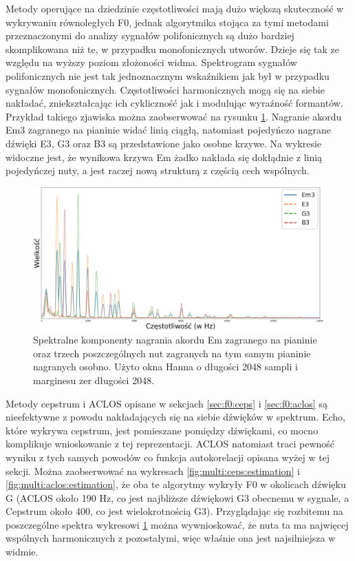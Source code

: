 \documentclass[12pt,a4paper,twoside]{mwart}
\begin{document}
Metody operujące na dziedzinie częstotliwości mają dużo większą skuteczność w wykrywaniu równoległych F0, jednak algorytmika stojąca za tymi metodami przeznaczonymi do analizy sygnałów polifonicznych są dużo bardziej skomplikowana niż te, w przypadku monofonicznych utworów. Dzieje się tak ze względu na wyższy poziom złożoności widma. Spektrogram sygnałów polifonicznych nie jest tak jednoznacznym wskaźnikiem jak był w przypadku sygnałów monofonicznych. Częstotliwości harmonicznych mogą się na siebie nakładać, zniekształcając ich cykliczność jak i modulując wyraźność formantów.  Przykład takiego zjawiska można zaobserwować na rysunku \ref{fig:multi:spectra:partials}. Nagranie akordu Em3 zagranego na pianinie widać linią ciągłą, natomiast pojedyńczo nagrane dźwięki E3, G3 oraz B3 są przedstawione jako osobne krzywe. Na wykresie widoczne jest, że wynikowa krzywa Em żadko nakłada się dokłądnie z linią pojedyńczej nuty, a jest raczej nową strukturą z częścią cech wspólnych.

\begin{figure}[ht]
  \begin{center}
    \includegraphics[scale=0.325]{images/Em/spectral_component_em3_partials_2048_512_cropped.png}
    \caption{Spektralne komponenty nagrania akordu Em zagranego na pianinie oraz trzech poszczególnych nut zagranych na tym samym pianinie nagranych osobno. Użyto okna Hanna o długości 2048 sampli i marginesu zer długości 2048.}
    \label{fig:multi:spectra:partials}
  \end{center}
\end{figure}

Metody cepstrum i ACLOS opisane w sekcjach \ref{sec:f0:ceps} i \ref{sec:f0:aclos} są nieefektywne z powodu nakładających się na siebie dźwięków w spektrum. Echo, które wykrywa cepstrum, jest pomieszane pomiędzy dźwiękami, co mocno komplikuje wnioskowanie z tej reprezentacji. ACLOS natomiast traci pewność wyniku z tych samych powodów co funkcja autokorelacji opisana wyżej w tej sekcji. Można zaobserwować na wykresach \ref{fig:multi:ceps:estimation} i \ref{fig:multi:aclos:estimation}, że oba te algorytmy wykryły F0 w okolicach dźwięku G (ACLOS około 190 Hz, co jest najbliższe dźwiękowi G3 obecnemu w sygnale, a Cepstrum około 400, co jest wielokrotnością G3). Przyglądając się rozbitemu na poszczególne spektra wykresowi \ref{fig:multi:spectra:partials} można wywnioskować, że nuta ta ma najwięcej wspólnych harmonicznych z pozostałymi, więc właśnie ona jest najsilniejsza w widmie.
\end{document}
